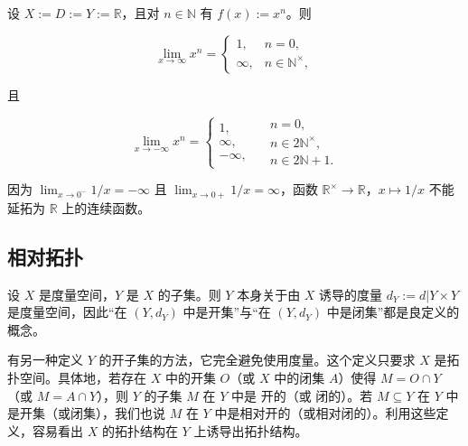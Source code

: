 \begin{example}
\begin{items}
设 $X := D := Y := \mathbb{R}$，且对 $n \in \mathbb{N}$ 有 $f(x) := x^n$。则

\begin{equation*}
\lim_{x\to\infty}x^{n}=\left\{\begin{array}{cl}1,&n=0,\\\infty,&n\in\mathbb{N}^{\times},\end{array}\right.
\end{equation*}

且

\begin{equation*}
\lim_{x\to-\infty}x^{n}=\left\{\begin{array}{r}1,\\ \infty,\\ -\infty,\end{array}\quad\begin{array}{l}n=0,\\ n\in2\mathbb{N}^{\times},\\ n\in2\mathbb{N}+1.\end{array}\right.
\end{equation*}
\item

因为 $ \lim_{x \to 0^-} 1/x = -\infty $ 且 $ \lim_{x \to 0+} 1/x = \infty $，函数 $ \mathbb{R}^\times \to \mathbb{R} $，$ x \mapsto 1/x $ 不能延拓为 $ \mathbb{R} $ 上的连续函数。

\end{items}

\end{example}

\subsection*{相对拓扑}

设 $X$ 是度量空间，$Y$ 是 $X$ 的子集。则 $Y$ 本身关于由 $X$ 诱导的度量 $d_Y := d|Y \times Y$ 是度量空间，因此“在 $(Y, d_Y)$ 中是开集”与“在 $(Y, d_Y)$ 中是闭集”都是良定义的概念。

有另一种定义 $Y$ 的开子集的方法，它完全避免使用度量。这个定义只要求 $X$ 是拓扑空间。具体地，若存在 $X$ 中的开集 $O$（或 $X$ 中的闭集 $A$）使得 $M = O \cap Y$（或 $M = A \cap Y$），则 $Y$ 的子集 $M$ 在 $Y$ 中是 $\text{开的}$（或 $\text{闭的}$）。若 $M \subseteq Y$ 在 $Y$ 中是开集（或闭集），我们也说 $M$ 在 $Y$ 中是相对开的（或相对闭的）。利用这些定义，容易看出 $X$ 的拓扑结构在 $Y$ 上诱导出拓扑结构。


